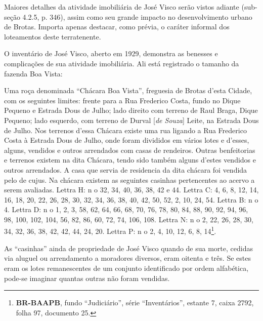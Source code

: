 Maiores detalhes da atividade imobiliária de José Visco serão vistos adiante (sub-seção 4.2.5, p. 346), assim como seu grande impacto no desenvolvimento urbano de Brotas. Importa apenas destacar, como prévia, o caráter informal dos loteamentos deste terratenente.

O inventário de José Visco, aberto em 1929, demonstra as benesses e complicações de sua atividade imobiliária. Ali está registrado o tamanho da fazenda Boa Vista:

\begin{citacao}
Uma roça denominada ``Chácara Boa Vista'', freguesia de Brotas d’esta Cidade, com os seguintes limites: frente para a Rua Frederico Costa, fundo no Dique Pequeno e Estrada Dous de Julho; lado direito com terreno de Raul Braga, Dique Pequeno; lado esquerdo, com terreno de Durval [\textit{de Souza}] Leite, na Estrada Dous de Julho. Nos terrenos d’essa Chácara existe uma rua ligando a Rua Frederico Costa à Estrada Dous de Julho, onde foram divididos em vários lotes e d’esses, alguns, vendidos e outros arrendados com casas de rendeiros. Outras benfeitorias e terrenos existem na dita Chácara, tendo sido também alguns d’estes vendidos e outros arrendados. A casa que servia de residencia da dita chácara foi vendida pelo de cujus. Na chácara existem as seguintes casinhas pertencentes ao acervo a serem avaliadas. Lettra H: n o 32, 34, 40, 36, 38, 42 e 44. Lettra C: 4, 6, 8, 12, 14, 16, 18, 20, 22, 26, 28, 30, 32, 34, 36, 38, 40, 42, 50, 52, 2, 10, 24, 54. Lettra B: n o 4. Lettra D: n o 1, 2, 3, 58, 62, 64, 66, 68, 70, 76, 78, 80, 84, 88, 90, 92, 94, 96, 98, 100, 102, 104, 56, 82, 86, 60, 72, 74, 106, 108. Lettra N: n o 2, 22, 26, 28, 30, 34, 32, 36, 38, 42, 42, 44, 24, 20. Lettra P: n o 2, 4, 10, 12, 6, 8, 14\footnote{\textbf{BR-BAAPB}, fundo ``Judiciário'', série ``Inventários'', estante 7, caixa 2792, folha 97, documento 25.}.
\end{citacao}

As ``casinhas'' ainda de propriedade de José Visco quando de sua morte, cedidas via aluguel ou arrendamento a moradores diversos, eram oitenta e três. Se estes eram os lotes remanescentes de um conjunto identificado por ordem alfabética, pode-se imaginar quantas outras não foram vendidas.

